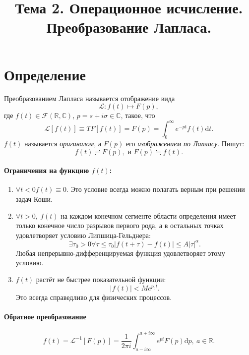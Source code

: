 \documentclass[12pt]{report}
\title{Тема 2. Операционное исчисление. Преобразование Лапласа.}
\renewcommand{\L}{\mathcal L}
\newcommand{\F}{\mathcal F}
\newcommand{\R}{\mathbb R}
\renewcommand{\C}{\mathbb C}
\newcommand{\rd}{\mathrm d}
\renewcommand{\i}{i}
\begin{document}
	\maketitle
	\tableofcontents
	
	
\section{Определение}
Преобразованием Лапласа называется отображение вида~\cite{Dubkov:Lecture}
\[
\L : f(t) \mapsto F(p),
\]
где $f(t) \in \F(\R, \C)$, $p = s + \i\sigma \in \C$, такое, что
\[
\L[f(t)]\equiv TF[f(t)] = F(p) = \int_{0}^{\infty} e^{-pt}f(t)\rd t.
\]
$f(t)$ называется \emph{оригиналом}, а $F(p)$ его \emph{изображением по Лапласу}. Пишут:
\[
f(t) \risingdotseq F(p), \text{ и } F(p) \fallingdotseq f(t). 
\]
\paragraph{Ограничения на функцию $f(t)$:}
\begin{enumerate}
	\item $\forall t < 0f(t) \equiv 0$. Это условие всегда можно полагать верным при решении задач Коши.
	\item $\forall t > 0,~ f(t)$ на каждом конечном сегменте области определения имеет только конечное число разрывов первого рода, а в остальных точках удовлетворяет условию Липшица-Гельднера: 
	\[\exists\tau_0>0\forall \tau \leq \tau_0 |f(t+\tau) - f(t)| \leq A|\tau|^\alpha.\]
	Любая непрерывно-дифференцируемая функция удовлетворяет этому условию.
	\item $f(t)$ растёт не быстрее показательной функции: \[ |f(t)| < Me^{p_0t}.\] Это всегда справедливо для физических процессов.
\end{enumerate}

\paragraph{Обратное преобразование}
\[
f(t) = \L^{-1}[F(p)] = \frac{1}{2\pi\i}\int_{a - \i\infty}^{a+\i\infty}e^{pt}F(p)\rd p, ~ a\in\R.
\]
\end{document}
